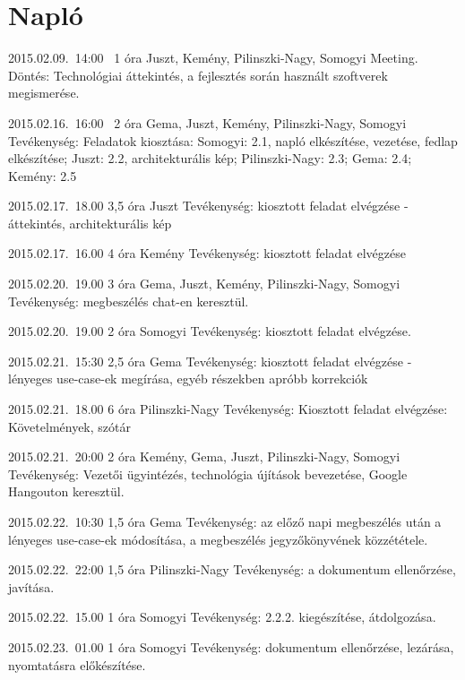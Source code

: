 %
\section{Napló}

\begin{naplo}

\bejegyzes
{2015.02.09.~14:00~} %
{1 óra} %
{Juszt, Kemény, Pilinszki-Nagy, Somogyi} %
{Meeting. Döntés: Technológiai áttekintés, a fejlesztés során használt szoftverek megismerése.} %

\bejegyzes
{2015.02.16.~16:00~}
{2 óra}
{Gema, Juszt, Kemény, Pilinszki-Nagy, Somogyi} %
{Tevékenység: Feladatok kiosztása: Somogyi: 2.1, napló elkészítése, vezetése, fedlap elkészítése; Juszt: 2.2, architekturális kép; Pilinszki-Nagy: 2.3; Gema: 2.4; Kemény: 2.5}

\bejegyzes
{2015.02.17.~18.00}
{3,5 óra}
{Juszt}
{Tevékenység: kiosztott feladat elvégzése - áttekintés, architekturális kép}

\bejegyzes
{2015.02.17.~16.00}
{4 óra}
{Kemény}
{Tevékenység: kiosztott feladat elvégzése}

\bejegyzes
{2015.02.20.~19.00}
{3 óra}
{Gema, Juszt, Kemény, Pilinszki-Nagy, Somogyi}
{Tevékenység: megbeszélés chat-en keresztül.}

\bejegyzes
{2015.02.20.~19.00}
{2 óra}
{Somogyi}
{Tevékenység: kiosztott feladat elvégzése.}

\bejegyzes
{2015.02.21.~15:30}
{2,5 óra}
{Gema}
{Tevékenység: kiosztott feladat elvégzése - lényeges use-case-ek megírása, egyéb részekben apróbb korrekciók}

\bejegyzes
{2015.02.21.~18.00}
{6 óra}
{Pilinszki-Nagy}
{Tevékenység: \newline Kiosztott feladat elvégzése: Követelmények, szótár}

\bejegyzes
{2015.02.21.~20:00}
{2 óra}
{Kemény, Gema, Juszt, Pilinszki-Nagy, Somogyi}
{Tevékenység: Vezetői ügyintézés, technológia újítások bevezetése, Google Hangouton keresztül.}

\bejegyzes
{2015.02.22.~10:30}
{1,5 óra}
{Gema}
{Tevékenység: az előző napi megbeszélés után a lényeges use-case-ek módosítása, a megbeszélés jegyzőkönyvének közzététele.}

\bejegyzes
{2015.02.22.~22:00}
{1,5 óra}
{Pilinszki-Nagy}
{Tevékenység: a dokumentum ellenőrzése, javítása.}

\bejegyzes
{2015.02.22.~15.00}
{1 óra}
{Somogyi}
{Tevékenység: 2.2.2. kiegészítése, átdolgozása.}

\bejegyzes
{2015.02.23.~01.00}
{1 óra}
{Somogyi}
{Tevékenység: dokumentum ellenőrzése, lezárása, nyomtatásra előkészítése.}
\end{naplo}

